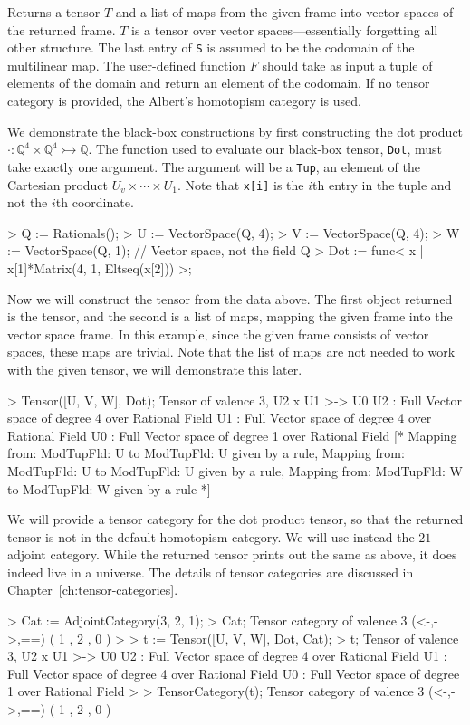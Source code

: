Returns a tensor $T$ and a list of maps from the given frame into vector spaces of the returned frame.
$T$ is a tensor over vector spaces---essentially forgetting all other structure.
The last entry of {\tt S} is assumed to be the codomain of the multilinear map. 
The user-defined function $F$ should take as input a tuple of elements of the domain and return an element of the codomain.
If no tensor category is provided, the Albert's homotopism category is used.

\begin{example}[BBTensorsFrame]
We demonstrate the black-box constructions by first constructing the dot product $\cdot : \mathbb{Q}^4\times \mathbb{Q}^4\rightarrowtail \mathbb{Q}$.
The function used to evaluate our black-box tensor, {\tt Dot}, must take exactly one argument.
The argument will be a {\tt Tup}, an element of the Cartesian product $U_v\times \cdots\times U_1$.
Note that {\tt x[i]} is the $i$th entry in the tuple and not the $i$th coordinate.
\begin{code}
> Q := Rationals();
> U := VectorSpace(Q, 4);
> V := VectorSpace(Q, 4);
> W := VectorSpace(Q, 1);  // Vector space, not the field Q
> Dot := func< x | x[1]*Matrix(4, 1, Eltseq(x[2])) >;
\end{code}

Now we will construct the tensor from the data above.
The first object returned is the tensor, and the second is a list of maps, mapping the given frame into the vector space frame.
In this example, since the given frame consists of vector spaces, these maps are trivial.
Note that the list of maps are not needed to work with the given tensor, we will demonstrate this later. 
\begin{code}
> Tensor([U, V, W], Dot);
Tensor of valence 3, U2 x U1 >-> U0
U2 : Full Vector space of degree 4 over Rational Field
U1 : Full Vector space of degree 4 over Rational Field
U0 : Full Vector space of degree 1 over Rational Field
[*
    Mapping from: ModTupFld: U to ModTupFld: U given by a rule,
    Mapping from: ModTupFld: U to ModTupFld: U given by a rule,
    Mapping from: ModTupFld: W to ModTupFld: W given by a rule
*]
\end{code}

We will provide a tensor category for the dot product tensor, so that the returned tensor is not in the default homotopism category. 
We will use instead the $21$-adjoint category.
While the returned tensor prints out the same as above, it does indeed live in a universe.
The details of tensor categories are discussed in Chapter~\ref{ch:tensor-categories}.
\begin{code}
> Cat := AdjointCategory(3, 2, 1);
> Cat;
Tensor category of valence 3 (<-,->,==) ({ 1 },{ 2 },{ 0 })
> 
> t := Tensor([U, V, W], Dot, Cat);
> t;
Tensor of valence 3, U2 x U1 >-> U0
U2 : Full Vector space of degree 4 over Rational Field
U1 : Full Vector space of degree 4 over Rational Field
U0 : Full Vector space of degree 1 over Rational Field
> 
> TensorCategory(t);
Tensor category of valence 3 (<-,->,==) ({ 1 },{ 2 },{ 0 })
\end{code}
\end{example}

